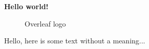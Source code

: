 \documentclass[../main.tex]{subfiles}
\begin{document}
\textbf{Hello world!}
\begin{figure}[bh]
\centering

\label{fig:img1}
\caption{Overleaf logo}
\end{figure}

Hello, here is some text without a meaning...
\end{document}
